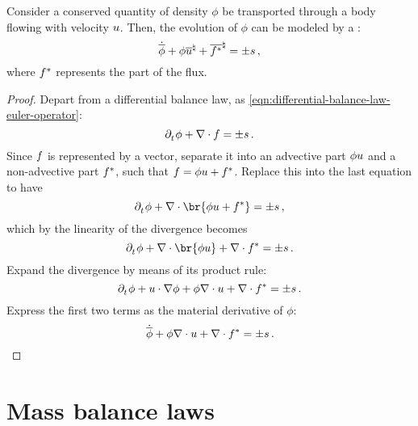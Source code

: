 \begin{theorem}
  Consider a conserved quantity of density $\phi$ be transported through a body flowing with velocity $u$. Then, the evolution of $\phi$ can be modeled by a :
  \begin{equation}\label{eqn:differential-balance-law-lagrange}
    \dot{\overline{\phi}} + \phi{\overline{u}}^{\natural} + {\overline{f^*}}^{\natural} = \pm s\,,
  \end{equation}
  where $f^*$ represents the  part of the flux.
\end{theorem}
%
\begin{proof}
  Depart from a differential balance law, as \cref{eqn:differential-balance-law-euler-operator}:
  \begin{equation*}
    \cpd t\phi + \odiv\flux = \pm\ssink\,.
  \end{equation*}
  Since $f$ is represented by a vector, separate it into an advective part $\phi u$ and a non-advective part $f^*$, such that $f = \phi u + f^*$. Replace this into the last equation to have
  \begin{equation*}
    \cpd t\phi + \odiv\br{\phi\vel + \naflux} = \pm\ssink\,,
  \end{equation*}
  which by the linearity of the divergence becomes
  \begin{equation*}
    \cpd t\phi + \odiv\br{\phi\vel} + \odiv\naflux = \pm\ssink\,.
  \end{equation*}
  Expand the divergence by means of its product rule:
  \begin{equation*}
    \cpd t\phi + \vel\iprod\ograd\phi + \phi\odiv\vel + \odiv\naflux = \pm\ssink\,.
  \end{equation*}
  Express the first two terms as the material derivative of $\phi$:
  \begin{equation*}
    \dot{\overline{\phi}} + \phi\nabla\cdot u + \nabla\cdot f^* = \pm s\,.
  \end{equation*}
\end{proof}


\section{Mass balance laws}
\label{sec:mass-balance-laws}

